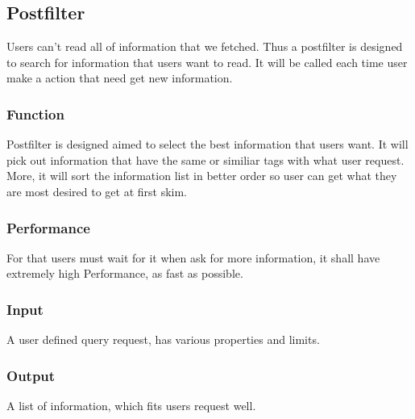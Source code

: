 
\subsection{Postfilter}
  Users can't read all of information that we fetched.
  Thus a postfilter is designed to search for information that users want to read.
  It will be called each time user make a action that need get new information.

  \subsubsection{Function}
    Postfilter is designed aimed to select the best information that users want.
    It will pick out information that have the same or similiar tags with what user request.
    More, it will sort the information list in better order so user can get what they are most desired to get at first skim.

  \subsubsection{Performance}
    For that users must wait for it when ask for more information, it shall have extremely high Performance, as fast as possible.

  \subsubsection{Input}
    A user defined query request, has various properties and limits.

  \subsubsection{Output}
    A list of information, which fits users request well.

